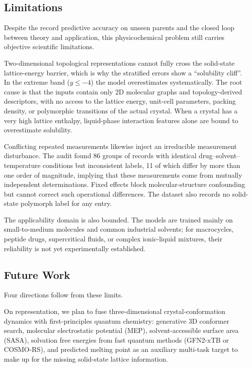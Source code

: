 \subsection{Limitations}

Despite the record predictive accuracy on unseen parents and the closed loop between theory and application, this physicochemical problem still carries objective scientific limitations.

Two-dimensional topological representations cannot fully cross the solid-state lattice-energy barrier, which is why the stratified errors show a ``solubility cliff''. In the extreme band ($y \le -4$) the model overestimates systematically. The root cause is that the inputs contain only 2D molecular graphs and topology-derived descriptors, with no access to the lattice energy, unit-cell parameters, packing density, or polymorphic transitions of the actual crystal. When a crystal has a very high lattice enthalpy, liquid-phase interaction features alone are bound to overestimate solubility.

Conflicting repeated measurements likewise inject an irreducible measurement disturbance. The audit found 86 groups of records with identical drug--solvent--temperature conditions but inconsistent labels, 11 of which differ by more than one order of magnitude, implying that these measurements come from mutually independent determinations. Fixed effects block molecular-structure confounding but cannot correct such operational differences. The dataset also records no solid-state polymorph label for any entry.

The applicability domain is also bounded. The models are trained mainly on small-to-medium molecules and common industrial solvents; for macrocycles, peptide drugs, supercritical fluids, or complex ionic-liquid mixtures, their reliability is not yet experimentally established.

\subsection{Future Work}

Four directions follow from these limits.

On representation, we plan to fuse three-dimensional crystal-conformation dynamics with first-principles quantum chemistry: generative 3D conformer search, molecular electrostatic potential (MEP), solvent-accessible surface area (SASA), solvation free energies from fast quantum methods (GFN2-xTB or COSMO-RS), and predicted melting point as an auxiliary multi-task target to make up for the missing solid-state lattice information.

